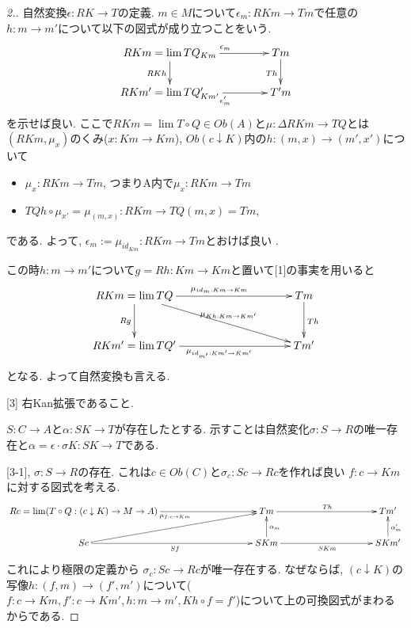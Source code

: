 \documentclass[dvipdfmx,a4paper,11pt]{article}
\theoremstyle{definition}
\begin{document}
\begin{proof}
[2.] 自然変換$\epsilon : RK \to T$の定義. 
$m \in M$について$\epsilon_m : RKm\to T m$で任意の$ h : m \to m'$について以下の図式が成り立つことをいう.  
\begin{equation*}
\xymatrix@C=40pt@R=20pt{
RKm = \lim T Q_{Km}  \ar@{->}[d]_{RK h}  \ar@{->}[r]^{\epsilon_m} & Tm\ar@{->}[d]_{Th} \\
RKm'= \lim TQ'_{Km'} \ar@{->}[r]_{\epsilon_m'} &T'm \\   
}
\end{equation*}
を示せば良い.
ここで$RKm =\lim T\circ Q \in Ob(A)$と$\mu: \Delta RKm \to TQ$とは
$(RKm , \mu_{x})$のくみ($x : Km \to Km $), $Ob(c \downarrow K )$内の$h : (m,x)\to (m',x')$について
\begin{itemize}
\item $\mu_{x} : RKm \to Tm  $, つまりA内で$\mu_{x} :  RKm\to Tm $
\item $ TQ h  \circ \mu_{x'} = \mu_{(m,x)} :RKm \to  TQ(m,x) =Tm$, 
\end{itemize}
である. 
よって, $\epsilon_{m} := \mu_{ id_{Km}} : RKm \to Tm$とおけば良い .

この時$h : m \to m'$について$g=Rh : Km \to Km$と置いて[1]の事実を用いると
\begin{equation*}
\xymatrix@C=100pt@R=30pt{
RKm = \lim TQ  \ar@{->}[d]_{Rg}  \ar@{->}[r]^{\mu_{ id_{m} : Km\to Km} }
\ar@{->}[rd]^{\mu_{Kh:  Km \to Km'}}
& Tm\ar@{->}[d]^{Th} \\
RKm' = \lim TQ' \ar@{->}[r]_{\mu_{ id_{m'} : Km' \to Km'}} &Tm' \\   
}
\end{equation*}
となる. 
よって自然変換も言える. 

[3] 右Kan拡張であること. 

$S : C \to A$と$\alpha : SK \to T$が存在したとする. 
示すことは自然変化$ \sigma : S \to R$の唯一存在と$\alpha = \epsilon \cdot \sigma K : SK \to T$である. 

[3-1], $\sigma : S \to R$の存在.
これは$c \in Ob(C)$と$\sigma_c : Sc \to Rc$を作れば良い
$f : c \to Km$に対する図式を考える.
\begin{equation*}
\xymatrix@C=100pt@R=20pt{
Rc = \lim (T \circ Q : (c \downarrow K) \to M \to A) \ar@{->}[r]_{\mu_{f : c \to Km}}  
& Tm \ar@{->}[r]^{Th}
&Tm'  \\
Sc\ar@{->}[r]_{Sf}  \ar@{->}[ru]
& SKm \ar@{->}[r]_{SKm} \ar@{->}[u]_{\alpha_m} 
&SKm' \ar@{->}[u]_{\alpha_m'} \\   
}
\end{equation*}
これにより極限の定義から
$\sigma_c : Sc \to Rc$が唯一存在する.
なぜならば, $(c \downarrow K)$の写像$ h : (f, m) \to (f', m')$について($f: c \to Km, f' : c \to Km', h: m \to m', Kh \circ f =f'$)について上の可換図式がまわるからである. 


\end{proof}
\end{document}

